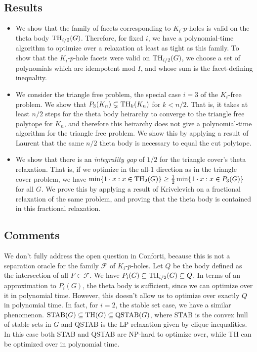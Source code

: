 \subsection{Results}
\begin{itemize}
\item We show that the family of facets corresponding to $K_i$-$p$-holes is valid on
the theta body $\textup{TH}_{i/2}(G)$.
Therefore, for fixed $i$, we have a polynomial-time algorithm to optimize over a relaxation at least as tight as this family. 
To show that the $K_i$-$p$-hole facets were valid on $\textup{TH}_{i/2}(G)$, we choose a set of 
polynomials which are idempotent mod $I$, and whose sum is the facet-defining
inequality.
\item We consider the triangle free problem, the special case $i=3$ of the
$K_i$-free problem. We show that $P_3(K_n) \subsetneq \textup{TH}_{k}(K_n)$ for $k < n/2$.
That is, it takes at least $n/2$ steps for the theta body heirarchy to converge
to the triangle free polytope for $K_n$, and therefore this heirarchy does not give a polynomial-time algorithm for the triangle free problem.
We show this by applying a result of Laurent \cite{moniquestuff} that the same $n/2$ theta body is necessary to equal the cut polytope.
\item We show that there is an {\em integrality gap} of $1/2$ for the triangle cover's theta relaxation. 
That is, if we optimize in the all-1 direction as in the triangle cover problem, we have $\min \{1 \cdot x: x \in \textup{TH}_2(G) \} \ge \frac{1}{2} \min \{1 \cdot x: x \in P_3(G)\}$ for all $G$. 
We prove this by applying a result of Krivelevich \cite{krivelevich} on a fractional relaxation of the same problem, and proving that the theta body is contained in this fractional relaxation.
\end{itemize}
\subsection{Comments}
We don't fully address the open question in Conforti, because this is not a separation oracle for the family $\mathcal{F}$ of $K_i$-$p$-holes. 
Let $Q$ be the body defined as the intersection of all $F \in \mathcal{F}$.
We have $P_i(G) \subseteq \textup{TH}_{i/2}(G) \subseteq Q$.
In terms of an approximation to $P_i(G)$, the theta body is sufficient, since we can optimize over it in polynomial time. 
However, this doesn't allow us to optimize over exactly $Q$ in polynomial time.
In fact, for $i=2$, the stable set case, we have a similar phenomenon.
$\textup{STAB}(G) \subseteq \textup{TH}(G) \subseteq \textup{QSTAB}(G)$, where STAB is the convex hull of stable sets in $G$ and QSTAB is the LP relaxation given by clique inequalities.
In this case both STAB and QSTAB are NP-hard to optimize over, while TH can be optimized over in polynomial time.

